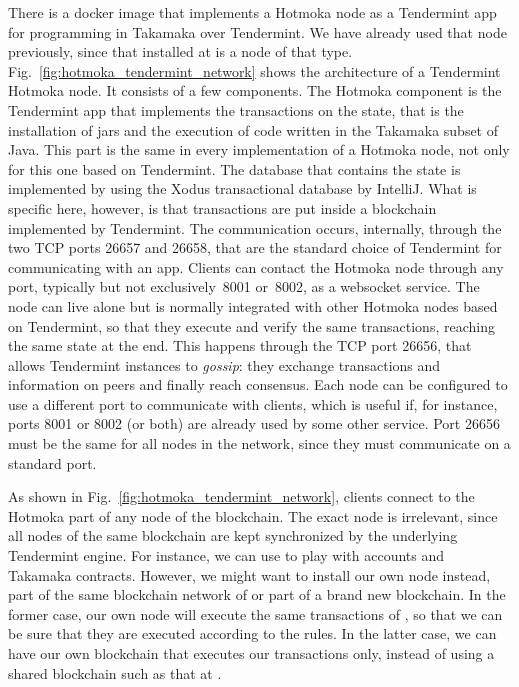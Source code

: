 There is a docker image that implements a Hotmoka node as a Tendermint app
for programming in Takamaka over Tendermint. We have already used that node
previously, since that installed at
\serverTendermint{} is a node of that type.
Fig.~\ref{fig:hotmoka_tendermint_network}
shows the architecture of a Tendermint Hotmoka node.
It consists of a few components.
The Hotmoka component is the Tendermint app that
implements the transactions on the state, that is the installation
of jars and the execution of code written in the Takamaka subset of Java. This part is the same in every
implementation of a Hotmoka node, not only for this one based on Tendermint.
The database that contains the state is implemented by
using the Xodus transactional database by IntelliJ.
What is specific here, however, is that transactions are put inside a blockchain
implemented by Tendermint. The communication occurs, internally, through the two TCP ports
26657 and 26658, that are the standard choice of Tendermint for communicating with an app.
Clients can contact the Hotmoka node
through any port, typically but not exclusively~8001 or~8002, as a websocket service.
The node can live alone but is normally integrated with other Hotmoka nodes based on Tendermint, so that
they execute and verify the same transactions, reaching the same state at the end. This happens through
the TCP port 26656, that allows Tendermint instances to \emph{gossip}:
they exchange transactions and information on peers and finally reach consensus.
Each node can be configured to use a different port to communicate with clients,
which is useful if, for instance, ports 8001 or 8002 (or both)
are already used by some other service.
Port 26656 must be the same for all nodes in the network, since they must communicate on
a standard port.

As shown in Fig.~\ref{fig:hotmoka_tendermint_network}, clients connect to the Hotmoka
part of any node of the blockchain. The exact node is irrelevant, since all nodes
of the same blockchain are kept synchronized by the underlying Tendermint engine.
For instance, we can use \serverTendermint{} to play with
accounts and Takamaka contracts. However, we might want to
install our own node instead, part of the same
blockchain network of \serverTendermint{}
or part of a brand new blockchain. In the former case, our own node will execute
the same transactions of \serverTendermint{}, so that we can be sure that they are
executed according to the rules. In the latter case, we can have our own blockchain that
executes our transactions only, instead of using a shared blockchain such as that
at \serverTendermint{}.

